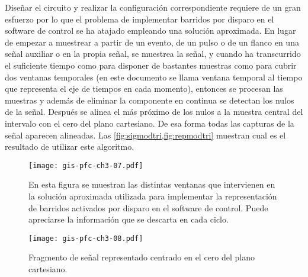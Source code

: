 Diseñar el circuito y realizar la configuración correspondiente requiere de
un gran esfuerzo por lo que el problema de implementar barridos por disparo
en el software de control se ha atajado empleando una solución aproximada.
En lugar de empezar a muestrear a partir de un evento, de un pulso o de un
flanco en una señal auxiliar o en la propia señal, se muestrea la señal, y
cuando ha transcurrido el suficiente tiempo como para disponer de bastantes
muestras como para cubrir dos ventanas temporales (en este documento se
llama ventana temporal al tiempo que representa el eje de tiempos en cada
momento), entonces se procesan las muestras y además de eliminar la
componente en continua se detectan los nulos de la señal. Después se alinea
el más próximo de los nulos a la muestra central del intervalo con el cero
del plano cartesiano. De esa forma todas las capturas de la señal aparecen
alineadas. Las \cref{fig:sigmodtri,fig:repmodtri} muestran cual es el
resultado de utilizar este algoritmo.

\begin{figure}
	\begin{center}
		\texttt{[image: gis-pfc-ch3-07.pdf]}
	\end{center}
	\caption[Representación de barridos por disparo]{En esta figura se
	muestran las distintas ventanas que intervienen en la solución
	aproximada utilizada para implementar la representación de barridos
	activados por disparo en el software de control. Puede apreciarse
	la información que se descarta en cada ciclo.}
	\label{fig:sigmodtri}
\end{figure}

\begin{figure}
	\begin{center}
		\texttt{[image: gis-pfc-ch3-08.pdf]}
	\end{center}
	\caption[Representación del fragmento de señal]{Fragmento de señal
	representado centrado en el cero del plano cartesiano.}
	\label{fig:repmodtri}
\end{figure}

